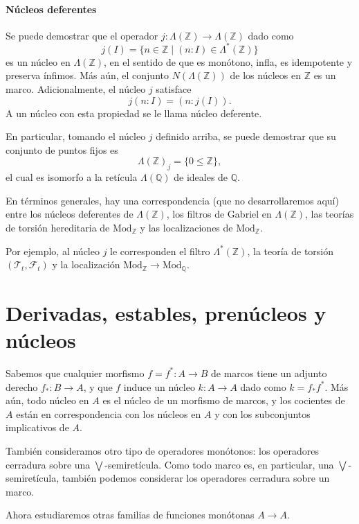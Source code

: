 \documentclass[12pt,letterpaper,titlepage]{article}
\theoremstyle{definition}
\newcommand\Sup{\bigvee}
\newcommand\Z{\mathbb Z}
\newcommand\Q{\mathbb Q}
\newcommand\nti[1]{\Lambda^{\text{*}}({#1})}
\newcommand\scr[1]{\mathscr{#1}}
\newcommand\<{\langle}
\renewcommand\>{\rangle}
\newcommand{\Mod}{\mathrm{Mod}}
\begin{document}
\paragraph{Núcleos deferentes}
Se puede demostrar que el operador $j:\Lambda(\Z)\to\Lambda(\Z)$
dado como
\[
    j(I) = \{n\in\Z\mid(n:I)\in\nti\Z\}
\]
es un núcleo en $\Lambda(\Z)$, en el sentido de que es monótono,
infla, es idempotente y preserva ínfimos.
Más aún, el conjunto $N(\Lambda(\Z))$ de los núcleos en $\Z$
es un marco.
Adicionalmente, el núcleo $j$ satisface
\[
    j(n:I) = (n:j(I))
.\]
A un núcleo con esta propiedad se le llama núcleo deferente.

En particular, tomando el núcleo $j$ definido arriba,
se puede demostrar que su conjunto de puntos fijos es
\[
    \Lambda(\Z)_j = \{0\leq \Z\}
,\]
el cual es isomorfo a la retícula $\Lambda(\Q)$ de ideales de $\Q$.

En términos generales, hay una correspondencia
(que no desarrollaremos aquí)
entre los núcleos deferentes de $\Lambda(\Z)$,
los filtros de Gabriel en $\Lambda(\Z)$,
las teorías de torsión hereditaria de $\Mod_\Z$
y las localizaciones de $\Mod_\Z$.

Por ejemplo, al núcleo $j$ le corresponden
el filtro $\nti\Z$, la teoría de torsión
$(\scr T_t,\scr F_t)$ y la localización
$\Mod_\Z\to\Mod_\Q$.

\section{Derivadas, estables, prenúcleos y núcleos}


Sabemos que cualquier morfismo $f=f^*:A\to B$ de marcos tiene
un adjunto derecho $f_*:B\to A$, y que $f$ induce un núcleo
$k:A\to A$ dado como $k=f_*f^*$.
Más aún, todo núcleo en $A$ es el núcleo de un morfismo de
marcos, y los cocientes de $A$ están en correspondencia con
los núcleos en $A$ y con los subconjuntos implicativos de $A$.

También consideramos otro tipo de operadores monótonos:
los operadores cerradura sobre una $\Sup$-semiretícula.
Como todo marco es, en particular, una $\Sup$-semiretícula, también
podemos considerar los operadores cerradura sobre un marco.

Ahora estudiaremos otras familias de funciones monótonas $A\to A$.
\end{document}
